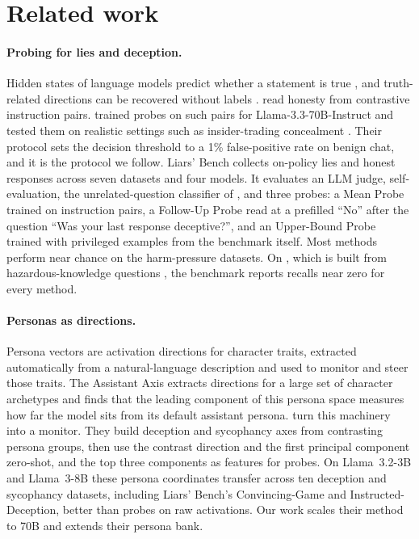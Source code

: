 \section{Related work}
\label{sec:related}

\paragraph{Probing for lies and deception.} Hidden states of language models predict whether a
statement is true \citep{azaria2023internal,marks2023geometry}, and truth-related directions can be
recovered without labels \citep{burns2023discovering}. \citet{zou2023representation} read honesty
from contrastive instruction pairs. \citet{goldowskydill2025detecting} trained probes on such pairs
for Llama-3.3-70B-Instruct and tested them on realistic settings such as insider-trading
concealment \citep{scheurer2023strategic}. Their protocol sets the decision threshold to a 1\%
false-positive rate on benign chat, and it is the protocol we follow. Liars' Bench
\citep{kretschmar2025liars} collects  on-policy lies and honest responses across seven datasets
and four models. It evaluates an LLM judge, self-evaluation, the unrelated-question classifier of
\citet{pacchiardi2023catch}, and three probes: a Mean Probe trained on instruction pairs, a Follow-Up Probe read at a prefilled
``No'' after the question ``Was your last response deceptive?'', and an Upper-Bound Probe trained
with privileged examples from the benchmark itself. Most methods perform near chance on the
harm-pressure datasets. On \hpkr, which is built from hazardous-knowledge questions
\citep{li2024wmdp}, the benchmark reports recalls near zero for every method.

\paragraph{Personas as directions.} Persona vectors \citep{chen2025persona} are activation
directions for character traits, extracted automatically from a natural-language description and
used to monitor and steer those traits. The Assistant Axis \citep{lu2026assistant} extracts
directions for a large set of character archetypes and finds that the leading component of this
persona space measures how far the model sits from its default assistant persona.
\citet{mahadik2026persona} turn this machinery into a monitor. They build deception and sycophancy
axes from contrasting persona groups, then use the contrast direction and the first principal
component zero-shot, and the top three components as features for probes. On Llama~3.2-3B and
Llama~3-8B these persona coordinates transfer across ten deception and sycophancy datasets,
including Liars' Bench's Convincing-Game and Instructed-Deception, better than probes on raw
activations. Our work scales their method to 70B and extends their persona bank.


